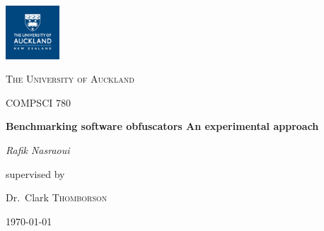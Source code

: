 \begin{titlepage}
	\centering
	\includegraphics[width=0.15\textwidth]{img/photo.jpg}\par\vspace{1cm}
	{\scshape\LARGE The University of Auckland \par}
	\vspace{1cm}
	{\scshape\Large COMPSCI 780\par}
	\vspace{1.5cm}
	{\huge\bfseries Benchmarking software obfuscators An experimental approach\par}
	\vspace{2cm}
	{\Large\itshape Rafik Nasraoui\par}
	\vfill
	supervised by\par
	Dr.~Clark \textsc{Thomborson}

	\vfill

	{\large \today\par}
\end{titlepage}